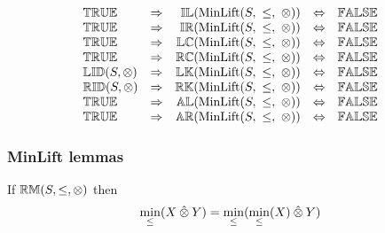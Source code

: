\documentclass[../Summary.tex]{subfiles}
\begin{document}
\[\begin{array}{lcrcl}
{\mathbb{TRUE}}
	& \Rightarrow
	& {\mathbb{IL}}(\mathrm{MinLift}(S,\ \leq,\ \otimes)) 
	& \Leftrightarrow 
	& {\mathbb{FALSE}} 
	\\ 
{\mathbb{TRUE}}
	& \Rightarrow
	& {\mathbb{IR}}(\mathrm{MinLift}(S,\ \leq,\ \otimes)) 
	& \Leftrightarrow 
	& {\mathbb{FALSE}} 
	\\ 
{\mathbb{TRUE}}
	& \Rightarrow
	& {\mathbb{LC}}(\mathrm{MinLift}(S,\ \leq,\ \otimes)) 
	& \Leftrightarrow 
	& {\mathbb{FALSE}} 
	\\ 
{\mathbb{TRUE}}
	& \Rightarrow
	& {\mathbb{RC}}(\mathrm{MinLift}(S,\ \leq,\ \otimes)) 
	& \Leftrightarrow 
	& {\mathbb{FALSE}} 
	\\ 
{\mathbb{LID}}(S, \otimes)
	& \Rightarrow
	& {\mathbb{LK}}(\mathrm{MinLift}(S,\ \leq,\ \otimes)) 
	& \Leftrightarrow 
	& {\mathbb{FALSE}} 
	\\ 
{\mathbb{RID}}(S, \otimes)
	& \Rightarrow
	& {\mathbb{RK}}(\mathrm{MinLift}(S,\ \leq,\ \otimes)) 
	& \Leftrightarrow 
	& {\mathbb{FALSE}} 
	\\ 
{\mathbb{TRUE}}
	& \Rightarrow
	& {\mathbb{AL}}(\mathrm{MinLift}(S,\ \leq,\ \otimes))  
	& \Leftrightarrow 
	& {\mathbb{FALSE}} 
	\\ 
{\mathbb{TRUE}}
	& \Rightarrow
	& {\mathbb{AR}}(\mathrm{MinLift}(S,\ \leq,\ \otimes))  
	& \Leftrightarrow 
	& {\mathbb{FALSE}} 
	\\ 
\end{array} 
\] 


\subsubsection{MinLift lemmas}

\begin{lemma} \label{lem:minlift_left_absorption}
If ${\mathbb{RM}}(S,\leq,\otimes)$ then
\begin{equation*}
\min_\leq(X \mathbin{\hat{\otimes}} Y) = \min_\leq(\min_\leq(X) \mathbin{\hat{\otimes}} Y)
\end{equation*}
\end{lemma}
\end{document}

